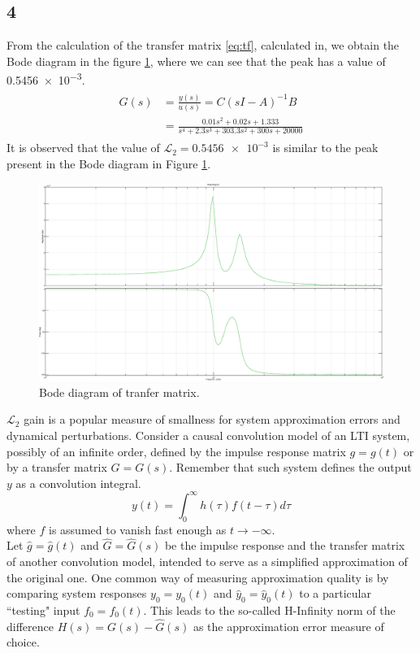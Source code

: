 \subsection{4}
From the calculation of the transfer matrix \eqref{eq:tf}, calculated in, we
obtain the Bode diagram in the figure \ref{fig:bodeplot}, where we can see that
the peak has a value of \num{0.5456e-3}.
\begin{align}
	\label{eq:tf}
	\begin{split}
		G(s) 	& = \frac{y(s)}{u(s)} = C(sI-A)^{-1}B\\
				& = \frac{0.01 s^2 + 0.02 s + 1.333}{s^4 + 2.3 s^3 + 303.3 s^2 + 300 s + 20000}
	\end{split}
\end{align}
It is observed that the value of \(\mathcal{L}_{2} = \num{0.5456e-3}\)  is
similar to the peak present in the Bode diagram in Figure \ref{fig:bodeplot}.
\begin{figure}[htb]
	\centering
	\includegraphics[width=0.75\linewidth]{bode}
	\caption{Bode diagram of tranfer matrix.}
	\label{fig:bodeplot}
\end{figure}
%
\(\mathcal{L}_{2}\) gain is a popular measure of smallness for system
approximation errors and dynamical perturbations.
Consider a causal convolution model of an LTI system, possibly of an
infinite order, defined by the impulse response matrix \(g = g(t)\) or by a
transfer matrix \(G = G(s)\).
Remember that such system defines the output \(y\) as a convolution integral.
\begin{equation}
	\label{eq:convintegral}
	y(t) = \int_{0}^{\infty} h(\tau)f(t-\tau)d\tau
\end{equation}
%
where \(f\) is assumed to vanish fast enough as \(t \rightarrow -\infty\).\\
Let \(\hat{g} = \hat{g}(t)\) and \(\hat{G} = \hat{G}(s)\) be the impulse
response and the transfer matrix of another convolution model, intended to
serve as a simplified approximation of the original one.
One common way of measuring approximation quality is by comparing system
responses \(y_{0} = y_{0}(t)\) and \(\hat{y}_{0} = \hat{y}_{0}(t)\) to a
particular ``testing" input \(f_{0} = f_{0}(t)\).
This leads to the so-called H-Infinity norm of the difference
 \(H(s) = G(s) - \hat{G}(s)\) as the approximation error measure of choice.
